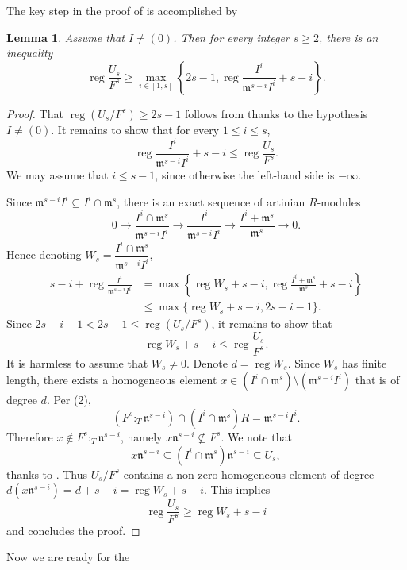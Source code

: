 \documentclass{amsart}
\DeclareMathOperator{\reg}{reg}
\newcommand{\mm}{\mathfrak{m}}
\newcommand{\nn}{\mathfrak{n}}
\theoremstyle{plain}
\newtheorem{lem}[thm]{Lemma}
\theoremstyle{definition}
\numberwithin{equation}{section}
\begin{document}
The key step in the proof of  is accomplished by

\begin{lem}
\label{lem_lowerbound_UsmodeFs}
Assume that $I \neq (0)$. Then for every integer $s\ge 2$, there is an inequality
\[
\reg \frac{U_s}{F^s} \ge \max_{i\in [1,s]} \left\{2s-1, \reg \frac{I^i}{\mm^{s-i}I^i}+s-i \right\}.
\]
\end{lem}
\begin{proof}
That  $\reg(U_s/F^s)\ge 2s-1$ follows from  thanks to the hypothesis $I\neq (0)$. It remains to show that for every $1\le i\le s$,
\[
\reg \frac{I^i}{\mm^{s-i}I^i}+s-i \le \reg \frac{U_s}{F^s}.
\]
We may assume that $i\le s-1$, since otherwise the left-hand side is $-\infty$.

Since $\mm^{s-i}I^i\subseteq I^i\cap \mm^s$, there is an exact sequence of artinian $R$-modules
\[
0\to \frac{I^i\cap \mm^s}{\mm^{s-i}I^i} \to \frac{I^i}{\mm^{s-i}I^i} \to \frac{I^i+\mm^s}{\mm^s} \to 0.
\]
Hence denoting $W_s=\dfrac{I^i\cap \mm^s}{\mm^{s-i}I^i}$,
\begin{align*}
s-i+\reg \frac{I^i}{\mm^{s-i}I^i} &=\max \left\{\reg W_s+s-i, \reg \frac{I^i+\mm^s}{\mm^s}+s-i \right\}\\
                                  &\le \max \{\reg W_s+s-i, 2s-i-1\}. 
\end{align*}
Since $2s-i-1 < 2s-1\le \reg (U_s/F^s)$, it remains to show that
\[
\reg W_s+ s-i \le \reg \frac{U_s}{F^s}.
\]
It is harmless to assume that $W_s\neq 0$. Denote $d=\reg W_s$. Since $W_s$ has finite length, there exists a homogeneous element $x\in (I^i\cap \mm^s) \setminus (\mm^{s-i}I^i)$ that is of degree $d$. Per (2),
\[
(F^s:_T \nn^{s-i})\cap (I^i\cap \mm^s)R=\mm^{s-i}I^i.
\]
Therefore $x\notin  F^s:_T \nn^{s-i}$, namely $x\nn^{s-i}\not\subseteq F^s$. We note that
\[
x\nn^{s-i} \subseteq (I^i\cap \mm^s)\nn^{s-i} \subseteq U_s,
\]
thanks to . Thus $U_s/F^s$ contains a non-zero homogeneous element of degree $d(x\nn^{s-i})=d+s-i=\reg W_s+s-i$. This implies
\[
\reg \frac{U_s}{F^s} \ge \reg W_s+ s-i 
\]
and concludes the proof.
\end{proof}
Now we are ready for the 
\end{document}
